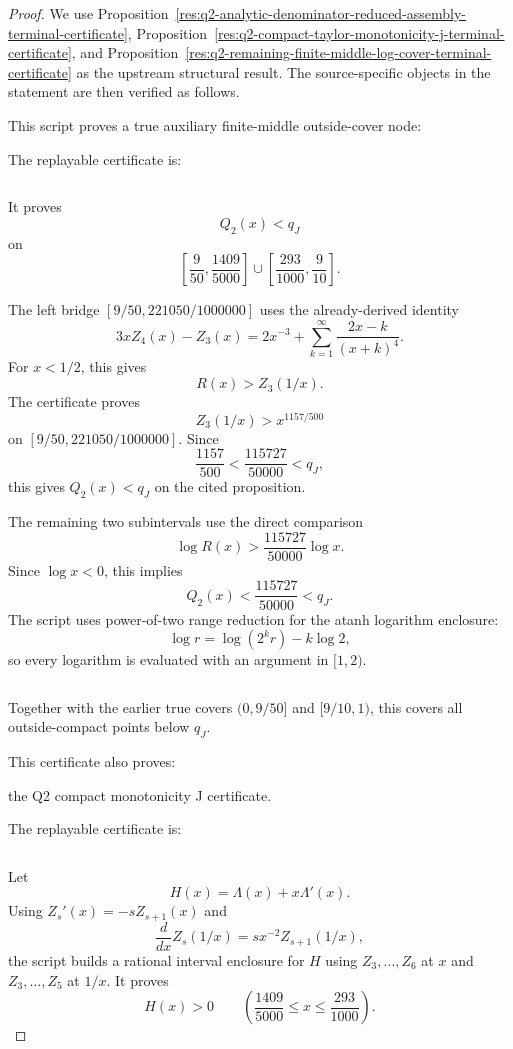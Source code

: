 \documentclass[11pt]{article}
\numberwithin{equation}{section}
\theoremstyle{definition}
\theoremstyle{remark}
\newcommand{\1}{\mathbf 1}
\begin{document}
\begin{proof}
We use Proposition~\ref{res:q2-analytic-denominator-reduced-assembly-terminal-certificate}, Proposition~\ref{res:q2-compact-taylor-monotonicity-j-terminal-certificate}, and Proposition~\ref{res:q2-remaining-finite-middle-log-cover-terminal-certificate} as the upstream structural result. The source-specific objects in the statement are then verified as follows.

This script proves a true auxiliary finite-middle outside-cover node:


The replayable certificate is:

\begin{verbatim}
\end{verbatim}

It proves
\[
Q_2(x)<q_J
\]
on
\[
\left[\frac9{50},\frac{1409}{5000}\right]
\cup
\left[\frac{293}{1000},\frac9{10}\right].
\]

The left bridge \([9/50,221050/1000000]\) uses the already-derived identity
\[
3xZ_4(x)-Z_3(x)
=2x^{-3}+\sum_{k=1}^{\infty}\frac{2x-k}{(x+k)^4}.
\]
For \(x<1/2\), this gives
\[
R(x)>Z_3(1/x).
\]
The certificate proves
\[
Z_3(1/x)>x^{1157/500}
\]
on \([9/50,221050/1000000]\). Since
\[
\frac{1157}{500}<\frac{115727}{50000}<q_J,
\]
this gives \(Q_2(x)<q_J\) on the cited proposition.

The remaining two subintervals use the direct comparison
\[
\log R(x)>\frac{115727}{50000}\log x.
\]
Since \(\log x<0\), this implies
\[
Q_2(x)<\frac{115727}{50000}<q_J.
\]
The script uses power-of-two range reduction for the atanh logarithm enclosure:
\[
\log r=\log(2^k r)-k\log 2,
\]
so every logarithm is evaluated with an argument in \([1,2)\).


\begin{verbatim}
\end{verbatim}

Together with the earlier true covers \((0,9/50]\) and \([9/10,1)\), this covers all outside-compact points below \(q_J\).

This certificate also proves:

the Q2 compact monotonicity J certificate.

The replayable certificate is:

\begin{verbatim}
\end{verbatim}

Let
\[
H(x)=\Lambda(x)+x\Lambda'(x).
\]
Using \(Z_s'(x)=-sZ_{s+1}(x)\) and
\[
\frac{d}{dx}Z_s(1/x)=s x^{-2} Z_{s+1}(1/x),
\]
the script builds a rational interval enclosure for \(H\) using \(Z_3,\ldots,Z_6\) at \(x\) and \(Z_3,\ldots,Z_5\) at \(1/x\). It proves
\[
H(x)>0
\qquad
\left(\frac{1409}{5000}\le x\le\frac{293}{1000}\right).
\]


\end{proof}
\end{document}
